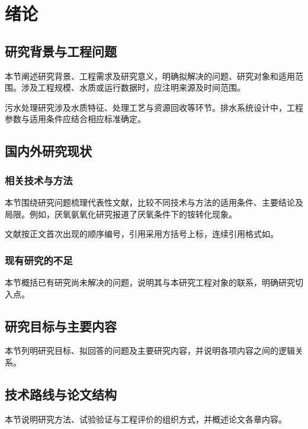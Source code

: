 \chapter{绪论}
\section{研究背景与工程问题}
本节阐述研究背景、工程需求及研究意义，明确拟解决的问题、研究对象和适用范围。涉及工程规模、水质或运行数据时，应注明来源及时间范围。

污水处理研究涉及水质特征、处理工艺与资源回收等环节\supercite{metcalf2014}。排水系统设计中，工程参数与适用条件应结合相应标准确定\supercite{gb50014}。
\section{国内外研究现状}
\subsection{相关技术与方法}
本节围绕研究问题梳理代表性文献，比较不同技术与方法的适用条件、主要结论及局限。例如，厌氧氨氧化研究报道了厌氧条件下的铵转化现象\supercite{mulder1995}。

文献按正文首次出现的顺序编号，引用采用方括号上标，连续引用格式如\supercite{tongji2025guide,tongji2026degree}。
\subsection{现有研究的不足}
本节概括已有研究尚未解决的问题，说明其与本研究工程对象的联系，明确研究切入点。
\section{研究目标与主要内容}
本节列明研究目标、拟回答的问题及主要研究内容，并说明各项内容之间的逻辑关系。
\section{技术路线与论文结构}
本节说明研究方法、试验验证与工程评价的组织方式，并概述论文各章内容。
